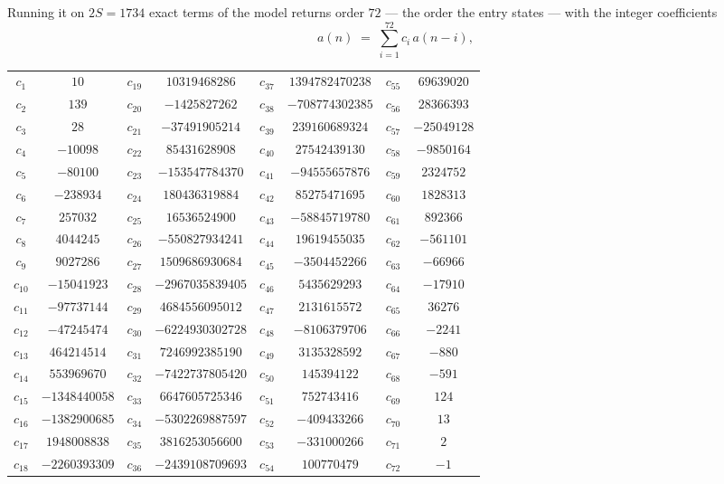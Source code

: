 \documentclass[11pt,a4paper]{article}
\theoremstyle{plain}
\theoremstyle{definition}
\begin{document}
Running it on $2S=1734$ exact terms of the model returns order $72$ --- the order the
entry states --- with the integer coefficients
\[
a(n)\;=\;\sum_{i=1}^{72}c_i\,a(n-i),
\]
\begin{center}\small
\begin{tabular}{cccccccc}
$c_{1}$ & $10$ & $c_{19}$ & $10319468286$ & $c_{37}$ & $1394782470238$ & $c_{55}$ & $69639020$ \\
$c_{2}$ & $139$ & $c_{20}$ & $-1425827262$ & $c_{38}$ & $-708774302385$ & $c_{56}$ & $28366393$ \\
$c_{3}$ & $28$ & $c_{21}$ & $-37491905214$ & $c_{39}$ & $239160689324$ & $c_{57}$ & $-25049128$ \\
$c_{4}$ & $-10098$ & $c_{22}$ & $85431628908$ & $c_{40}$ & $27542439130$ & $c_{58}$ & $-9850164$ \\
$c_{5}$ & $-80100$ & $c_{23}$ & $-153547784370$ & $c_{41}$ & $-94555657876$ & $c_{59}$ & $2324752$ \\
$c_{6}$ & $-238934$ & $c_{24}$ & $180436319884$ & $c_{42}$ & $85275471695$ & $c_{60}$ & $1828313$ \\
$c_{7}$ & $257032$ & $c_{25}$ & $16536524900$ & $c_{43}$ & $-58845719780$ & $c_{61}$ & $892366$ \\
$c_{8}$ & $4044245$ & $c_{26}$ & $-550827934241$ & $c_{44}$ & $19619455035$ & $c_{62}$ & $-561101$ \\
$c_{9}$ & $9027286$ & $c_{27}$ & $1509686930684$ & $c_{45}$ & $-3504452266$ & $c_{63}$ & $-66966$ \\
$c_{10}$ & $-15041923$ & $c_{28}$ & $-2967035839405$ & $c_{46}$ & $5435629293$ & $c_{64}$ & $-17910$ \\
$c_{11}$ & $-97737144$ & $c_{29}$ & $4684556095012$ & $c_{47}$ & $2131615572$ & $c_{65}$ & $36276$ \\
$c_{12}$ & $-47245474$ & $c_{30}$ & $-6224930302728$ & $c_{48}$ & $-8106379706$ & $c_{66}$ & $-2241$ \\
$c_{13}$ & $464214514$ & $c_{31}$ & $7246992385190$ & $c_{49}$ & $3135328592$ & $c_{67}$ & $-880$ \\
$c_{14}$ & $553969670$ & $c_{32}$ & $-7422737805420$ & $c_{50}$ & $145394122$ & $c_{68}$ & $-591$ \\
$c_{15}$ & $-1348440058$ & $c_{33}$ & $6647605725346$ & $c_{51}$ & $752743416$ & $c_{69}$ & $124$ \\
$c_{16}$ & $-1382900685$ & $c_{34}$ & $-5302269887597$ & $c_{52}$ & $-409433266$ & $c_{70}$ & $13$ \\
$c_{17}$ & $1948008838$ & $c_{35}$ & $3816253056600$ & $c_{53}$ & $-331000266$ & $c_{71}$ & $2$ \\
$c_{18}$ & $-2260393309$ & $c_{36}$ & $-2439108709693$ & $c_{54}$ & $100770479$ & $c_{72}$ & $-1$ \\
\end{tabular}
\end{center}
\end{document}
